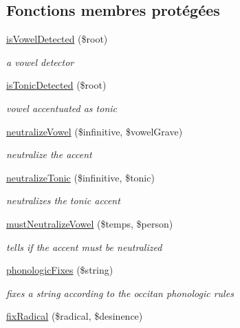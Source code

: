\subsection*{Fonctions membres protégées}
\begin{DoxyCompactItemize}
\item 
\hyperlink{classConjugationBase_af8a92808eec27a866fe83fe64ba10784}{is\+Vowel\+Detected} (\$root)
\begin{DoxyCompactList}\small\item\em a vowel detector \end{DoxyCompactList}\item 
\hyperlink{classConjugationBase_a5fd0cc4d15523febc5eabfc41d8bdb21}{is\+Tonic\+Detected} (\$root)
\begin{DoxyCompactList}\small\item\em vowel accentuated as tonic \end{DoxyCompactList}\item 
\hyperlink{classConjugationBase_a7d66d915461d677c63117166cb85e813}{neutralize\+Vowel} (\$infinitive, \$vowel\+Grave)
\begin{DoxyCompactList}\small\item\em neutralize the accent \end{DoxyCompactList}\item 
\hyperlink{classConjugationBase_a4fa62e858acfcf5eb83c11645687690c}{neutralize\+Tonic} (\$infinitive, \$tonic)
\begin{DoxyCompactList}\small\item\em neutralizes the tonic accent \end{DoxyCompactList}\item 
\hyperlink{classConjugationBase_aeaff0cedbe91b8a5cd534401d3b3ed74}{must\+Neutralize\+Vowel} (\$temps, \$person)
\begin{DoxyCompactList}\small\item\em tells if the accent must be neutralized \end{DoxyCompactList}\item 
\hyperlink{classConjugationBase_a4e623e786e39aecdaf26913685f9f040}{phonologic\+Fixes} (\$string)
\begin{DoxyCompactList}\small\item\em fixes a string according to the occitan phonologic rules \end{DoxyCompactList}\item 
\hyperlink{classConjugationBase_ab55301132f0c90c3b5bf7f6cb44fc6b4}{fix\+Radical} (\$radical, \$desinence)

\end{DoxyCompactItemize}
